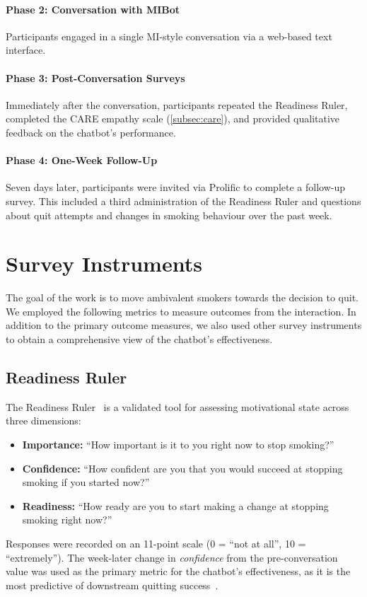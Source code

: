 \paragraph{Phase 2: Conversation with MIBot}
Participants engaged in a single MI-style conversation via a web-based text interface.

\paragraph{Phase 3: Post-Conversation Surveys}
Immediately after the conversation, participants repeated the Readiness Ruler,
completed the CARE empathy scale (\cref{subsec:care}), and provided qualitative
feedback on the chatbot's performance.

\paragraph{Phase 4: One-Week Follow-Up}
Seven days later, participants were invited via Prolific to complete a follow-up
survey. This included a third administration of the Readiness Ruler and questions about
quit attempts and changes in smoking behaviour over the past week.

\section{Survey Instruments}
\label{subsec:survey-instruments}

The goal of the work is to move ambivalent smokers towards the decision to quit. We
employed the following metrics to measure outcomes from the interaction. In addition to
the primary outcome measures, we also used other survey instruments to obtain a
comprehensive view of the chatbot's effectiveness.

\subsection{Readiness Ruler}
\label{subsec:readiness-ruler}
The Readiness Ruler~\citep{rollnick1992development} is a validated tool for assessing motivational state across three dimensions:
\begin{itemize}
	\item \textbf{Importance:} ``How important is it to you right now to stop smoking?''
	\item \textbf{Confidence:} ``How confident are you that you would succeed at stopping smoking if you started now?''
	\item \textbf{Readiness:} ``How ready are you to start making a change at stopping smoking right now?''
\end{itemize}
Responses were recorded on an 11-point scale (0 = ``not at all'', 10 = ``extremely''). The week-later change in \emph{confidence} from the pre-conversation value was used as the primary metric for the chatbot's effectiveness, as it is the most predictive of downstream quitting success~\citep{Gwaltney2009-wj,Abar2013}.

